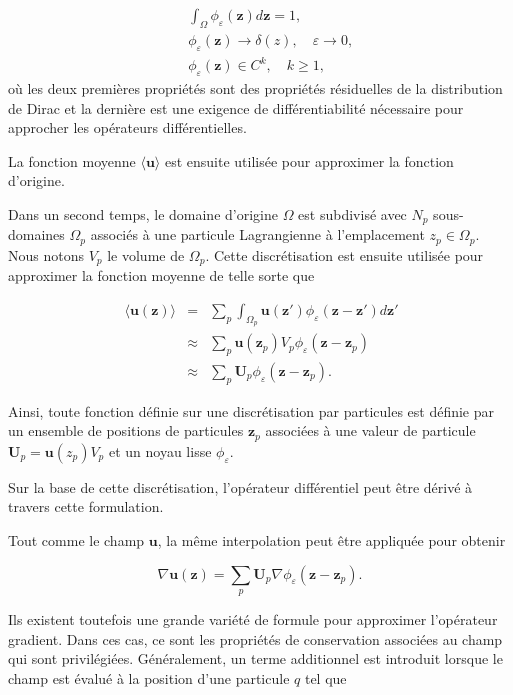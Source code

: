 \begin{eqnarray*}
    && \int_{\Omega} \phi_\varepsilon(\bm{z}) d\bm{z} = 1,      \\
    && \phi_\varepsilon(\bm{z}) \to \delta(z), \quad \varepsilon \to 0, \\
    && \phi_\varepsilon(\bm{z}) \in C^k,  \quad k \geq 1,
\end{eqnarray*} où les deux premières propriétés sont des propriétés résiduelles de la distribution de Dirac et la dernière est une exigence de différentiabilité nécessaire pour approcher les opérateurs différentielles.

La fonction moyenne $\langle \bm{u} \rangle$ est ensuite utilisée pour approximer la fonction d'origine.

Dans un second temps, le domaine d'origine $\Omega$ est subdivisé avec $N_p$ sous-domaines $\Omega_p$ associés à une particule Lagrangienne à l'emplacement $z_p \in \Omega_p$. Nous notons $V_p$ le volume de $\Omega_p$. Cette discrétisation est ensuite utilisée pour approximer la fonction moyenne de telle sorte que

\begin{eqnarray*}~\label{eq:part_approx}
    \langle \bm{u}(\bm{z}) \rangle &=& \sum_p \int_{\Omega_p} \bm{u}(\bm{z'}) \phi_\varepsilon(\bm{z}-\bm{z'}) d\bm{z'} \\
    &\approx& \sum_p \bm{u}(\bm{z}_p) V_p \phi_\varepsilon (\bm{z}-\bm{z}_p) \\
    &\approx& \sum_p \bm{U}_p \phi_\varepsilon (\bm{z}-\bm{z}_p).
\end{eqnarray*}

Ainsi, toute fonction définie sur une discrétisation par particules est définie par un ensemble de positions de particules $\bm{z}_p$ associées à une valeur de particule $\bm{U}_p = \bm{u}(z_p) V_p$ et un noyau lisse $\phi_\varepsilon$.

Sur la base de cette discrétisation, l'opérateur différentiel peut être dérivé à travers cette formulation.

Tout comme le champ $\bm u$, la même interpolation peut être appliquée pour obtenir

\begin{equation*}
    \nabla \bm{u}(\bm{z}) = \sum_p \bm{U}_p \nabla \phi_\varepsilon (\bm{z}-\bm{z}_p).
\end{equation*}

Ils existent toutefois une grande variété de formule pour approximer l'opérateur gradient. Dans ces cas, ce sont les propriétés de conservation associées au champ qui sont privilégiées.
Généralement, un terme additionnel est introduit lorsque le champ est évalué à la position d'une particule $q$ tel que

